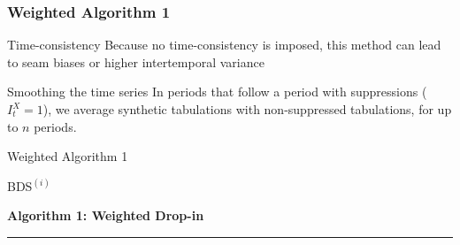 \begin{frame}
	\frametitle{Weighted Algorithm 1}
	\begin{block}{Time-consistency}
	Because no time-consistency is imposed, this method can lead to seam biases or higher 	intertemporal variance
\end{block}
\pause
\begin{block}{Smoothing the time series}
In periods that follow a period with suppressions ($I_{t}^X = 1$), we average synthetic tabulations with 	non-suppressed tabulations, for up to $n$ periods.
\end{block}
\end{frame}

\begin{frame}[fragile]{Weighted Algorithm 1}

\begin{block}{BDS$^{(i)}$}
\begin{algorithm}
{\bf Algorithm 1: Weighted Drop-in}
\hrule
\label{alg1}
\begin{algorithmic}
\Else
\EndIf
\end{algorithmic}
\end{algorithm}
\end{block}
\end{frame}

%

